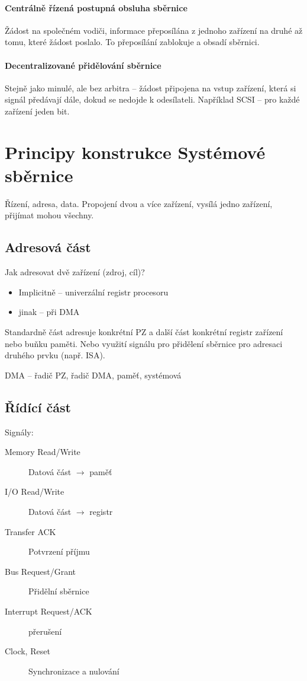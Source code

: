 \documentclass[a4wide]{report}
\begin{document}
\paragraph{Centrálně řízená postupná obsluha sběrnice}
Žádost na společném vodiči, informace  přeposílána  z jednoho zařízení na druhé až tomu, které žádost poslalo. To přeposílání zablokuje a obsadí sběrnici.

\paragraph{Decentralizované přidělování sběrnice}
Stejně jako minulé, ale bez arbitra -- žádost připojena na vstup zařízení, která si signál předávají dále, dokud se nedojde k odesílateli. Například SCSI -- pro každé zařízení jeden bit.

\section{Principy konstrukce Systémové sběrnice}

Řízení, adresa, data. Propojení dvou a více zařízení, vysílá jedno zařízení, přijímat mohou všechny. 

\subsection{Adresová část}
Jak adresovat dvě zařízení (zdroj, cíl)?
\begin{itemize}
	\item Implicitně -- univerzální registr procesoru
	\item jinak -- při DMA
\end{itemize}

Standardně část adresuje konkrétní PZ a další část konkrétní registr zařízení nebo buňku paměti. Nebo využití signálu pro přidělení sběrnice pro adresaci druhého prvku (např. ISA).

DMA -- řadič PZ, řadič DMA, paměť, systémová 

\subsection{Řídící část}

Signály:
\begin{description}
	\item[Memory Read/Write] Datová část $\to$ paměť
	\item[I/O Read/Write] Datová část $\to$ registr
	\item[Transfer ACK] Potvrzení příjmu
	\item[Bus Request/Grant] Přidělní sběrnice
	\item[Interrupt Request/ACK] přerušení
	\item[Clock, Reset] Synchronizace a nulování
\end{description}
\end{document}
